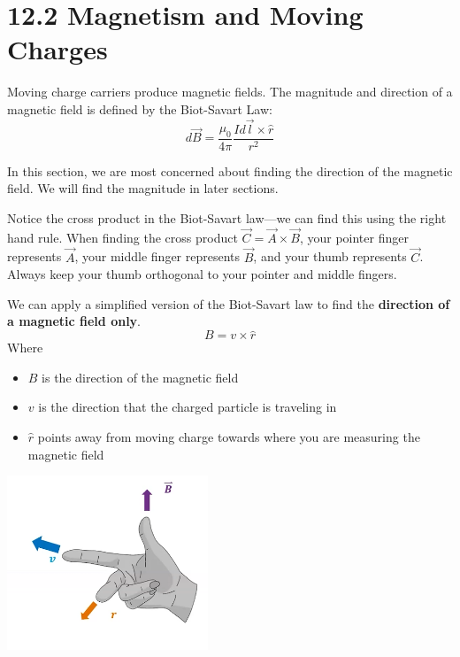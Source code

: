 \documentclass[12pt, titlepage]{article}
\begin{document}
\section*{12.2 Magnetism and Moving Charges}

Moving charge carriers produce magnetic fields. The magnitude and direction of a magnetic field is defined by the Biot-Savart Law:
\begin{equation*}
    d\vec{B} = \frac{\mu_0}{4\pi}\frac{Id\vec{l}\times\hat{r}}{r^2}
\end{equation*}

In this section, we are most concerned about finding the direction of the magnetic field. We will find the magnitude in later sections.

Notice the cross product in the Biot-Savart law---we can find this using the right hand rule. When finding the cross product $\vec{C}=\vec{A}\times\vec{B}$, your pointer finger represents $\vec{A}$, your middle finger represents $\vec{B}$, and your thumb represents $\vec{C}$. Always keep your thumb orthogonal to your pointer and middle fingers.

We can apply a simplified version of the Biot-Savart law to find the \textbf{direction of a magnetic field only}.
\begin{equation*}
    B=v\times\hat{r}
\end{equation*}
Where
\begin{itemize}
    \item \textbf{$B$} is the direction of the magnetic field
    \item \textbf{$v$} is the direction that the charged particle is traveling in 
    \item \textbf{$\hat{r}$} points away from moving charge towards where you are measuring the magnetic field
\end{itemize}

\begin{center}
    \includegraphics[width=6cm]{media/rh1.png}
\end{center}
\end{document}
